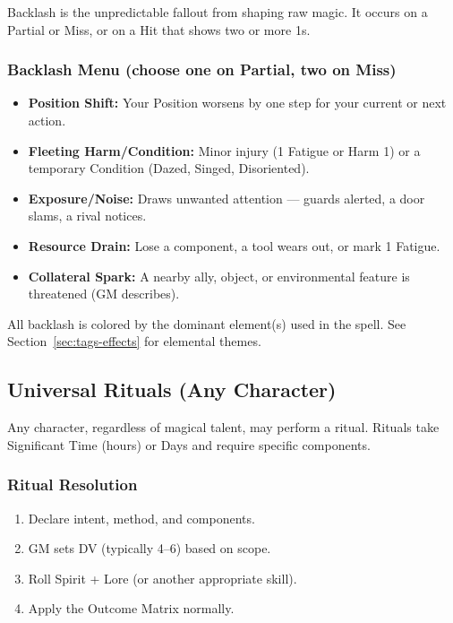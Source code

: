 Backlash is the unpredictable fallout from shaping raw magic. It occurs on a Partial or Miss, or on a Hit that shows two or more 1s.

\subsubsection{Backlash Menu (choose one on Partial, two on Miss)}
\begin{itemize}
  \item \textbf{Position Shift:} Your Position worsens by one step for your current or next action.
  \item \textbf{Fleeting Harm/Condition:} Minor injury (1 Fatigue or Harm 1) or a temporary Condition (Dazed, Singed, Disoriented).
  \item \textbf{Exposure/Noise:} Draws unwanted attention — guards alerted, a door slams, a rival notices.
  \item \textbf{Resource Drain:} Lose a component, a tool wears out, or mark 1 Fatigue.
  \item \textbf{Collateral Spark:} A nearby ally, object, or environmental feature is threatened (GM describes).
\end{itemize}

All backlash is colored by the dominant element(s) used in the spell. See Section~\ref{sec:tags-effects} for elemental themes.

\subsection{Universal Rituals (Any Character)}

Any character, regardless of magical talent, may perform a ritual. Rituals take Significant Time (hours) or Days and require specific components.

\subsubsection{Ritual Resolution}
\begin{enumerate}
  \item Declare intent, method, and components.
  \item GM sets DV (typically 4–6) based on scope.
  \item Roll Spirit + Lore (or another appropriate skill).
  \item Apply the Outcome Matrix normally.
\end{enumerate}

